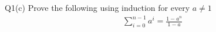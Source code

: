 \begin{problem}
  {Q1(c)}
  Prove the following using induction for every $a \ne 1$ \\
  \begin{align*}
    \sum_{i=0}^{n-1}a^i = \frac{1 - a^n}{1-a}
  \end{align*}
\end{problem}
